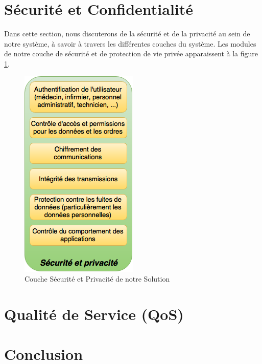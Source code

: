 \documentclass{article}
\begin{document}
\section{Sécurité et Confidentialité}
Dans cette section, nous discuterons de la sécurité et de la privacité au sein de notre système, à savoir à travers les différentes couches du système. Les modules de notre couche de sécurité et de protection de vie privée apparaissent à la figure \ref{securite}.
\newline
\begin{figure}[h!]
	\centering
	\includegraphics[width=0.5\textwidth]{securite.png}
	\caption{Couche Sécurité et Privacité de notre Solution}
	\label{securite}
\end{figure}



\section{Qualité de Service (QoS)}


\section{Conclusion}










\end{document}
